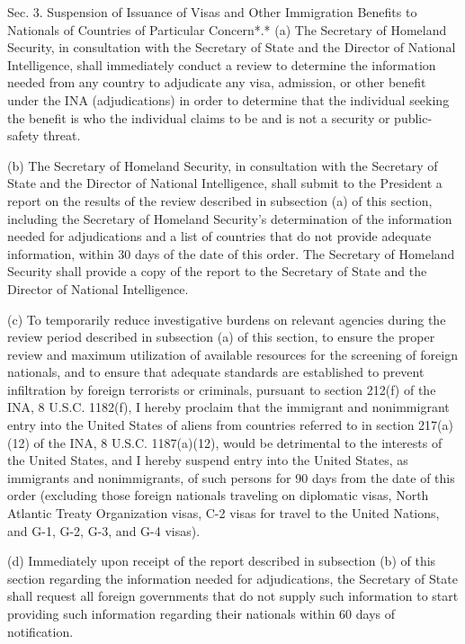 Sec. 3. Suspension of Issuance of Visas and Other Immigration Benefits
to Nationals of Countries of Particular Concern*.* (a) The Secretary of
Homeland Security, in consultation with the Secretary of State and the
Director of National Intelligence, shall immediately conduct a review to
determine the information needed from any country to adjudicate any
visa, admission, or other benefit under the INA (adjudications) in order
to determine that the individual seeking the benefit is who the
individual claims to be and is not a security or public-safety threat.

(b) The Secretary of Homeland Security, in consultation with the
Secretary of State and the Director of National Intelligence, shall
submit to the President a report on the results of the review described
in subsection (a) of this section, including the Secretary of Homeland
Security's determination of the information needed for adjudications and
a list of countries that do not provide adequate information, within 30
days of the date of this order. The Secretary of Homeland Security shall
provide a copy of the report to the Secretary of State and the Director
of National Intelligence.

(c) To temporarily reduce investigative burdens on relevant agencies
during the review period described in subsection (a) of this section, to
ensure the proper review and maximum utilization of available resources
for the screening of foreign nationals, and to ensure that adequate
standards are established to prevent infiltration by foreign terrorists
or criminals, pursuant to section 212(f) of the INA, 8 U.S.C. 1182(f), I
hereby proclaim that the immigrant and nonimmigrant entry into the
United States of aliens from countries referred to in section 217(a)(12)
of the INA, 8 U.S.C. 1187(a)(12), would be detrimental to the interests
of the United States, and I hereby suspend entry into the United States,
as immigrants and nonimmigrants, of such persons for 90 days from the
date of this order (excluding those foreign nationals traveling on
diplomatic visas, North Atlantic Treaty Organization visas, C-2 visas
for travel to the United Nations, and G-1, G-2, G-3, and G-4 visas).

(d) Immediately upon receipt of the report described in subsection (b)
of this section regarding the information needed for adjudications, the
Secretary of State shall request all foreign governments that do not
supply such information to start providing such information regarding
their nationals within 60 days of notification.

